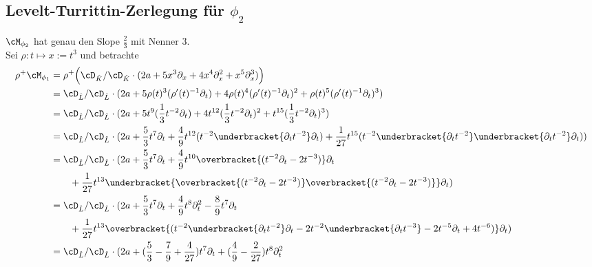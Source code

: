 \subsection{Levelt-Turrittin-Zerlegung für $\phi_2$}
$\cM_{\phi_2}$ hat genau den Slope $\frac{2}{3}$ mit Nenner $3$.\\
Sei $\rho:t\mapsto x:=t^3$ und betrachte
\begin{align*}
\rho^+\cM_{\phi_1} &= \rho^+\Big( \cD_{\hat K}/\cD_{\hat
  K}\cdot(2a+5x^3\partial_x+4x^{4}\partial_x^2+x^5\partial_x^3) \Big) \\
&= \cD_{\hat L}/\cD_{\hat L}\cdot(2a+
  5\rho(t)^3(\rho'(t)^{-1}\partial_t)
  +4\rho(t)^{4}(\rho'(t)^{-1}\partial_t)^2
  +\rho(t)^5(\rho'(t)^{-1}\partial_t)^3) \\
&= \cD_{\hat L}/\cD_{\hat L}\cdot(2a+
  5t^9(\frac{1}{3}t^{-2}\partial_t)
  +4t^{12}(\frac{1}{3}t^{-2}\partial_t)^2
  +t^{15}(\frac{1}{3}t^{-2}\partial_t)^3) \\
&= \cD_{\hat L}/\cD_{\hat L}\cdot(2a+
  \frac{5}{3}t^7\partial_t
  +\frac{4}{9}t^{12}(t^{-2}
    \underbracket{\partial_tt^{-2}}
    \partial_t)
  +\frac{1}{27}t^{15}(t^{-2}
    \underbracket{\partial_tt^{-2}}
    \underbracket{\partial_tt^{-2}}
    \partial_t)) \\
&\begin{aligned}
&= \cD_{\hat L}/\cD_{\hat L}\cdot(2a+
  \frac{5}{3}t^7\partial_t
  +\frac{4}{9}t^{10}
    \overbracket{(t^{-2}\partial_t-2t^{-3})}
    \partial_t\\
  &\qquad+\frac{1}{27}t^{13}
    \underbracket{
      \overbracket{(t^{-2}\partial_t-2t^{-3})}
      \overbracket{(t^{-2}\partial_t-2t^{-3})}
    }
    \partial_t) \\
\end{aligned}\\
&\begin{aligned}
&= \cD_{\hat L}/\cD_{\hat L}\cdot(2a+
  \frac{5}{3}t^7\partial_t
  +\frac{4}{9}t^{8}\partial_t^2
  -\frac{8}{9}t^{7}\partial_t\\
  &\qquad+\frac{1}{27}t^{13}
    \overbracket{(
      t^{-2}\underbracket{\partial_tt^{-2}}\partial_t
      -2t^{-2}\underbracket{\partial_tt^{-3}}
      -2t^{-5}\partial_t
      +4t^{-6}
    )}
    \partial_t) \\
\end{aligned}\\
&\begin{aligned}
  &= \cD_{\hat L}/\cD_{\hat L}\cdot(2a+
    (\frac{5}{3}-\frac{7}{9}+\frac{4}{27})t^7\partial_t
    +(\frac{4}{9}-\frac{2}{27})t^{8}\partial_t^2

\end{aligned}
\end{align*}
